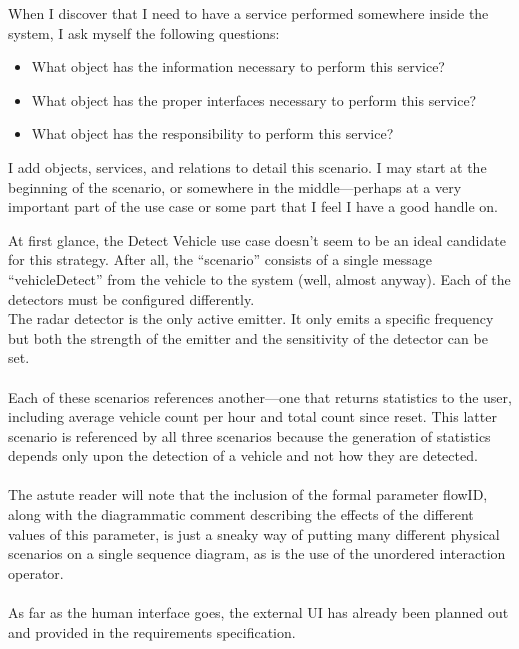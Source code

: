 \documentclass[12pt,a4paper]{article}
\begin{document}
When I discover that I need to have a service performed
somewhere inside the system, I ask myself the following questions:
\begin{itemize}
\item What object has the information necessary to perform this service?
\item What object has the proper interfaces necessary to perform this service?
\item What object has the responsibility to perform this service?

\end{itemize}
I add objects, services, and relations to detail this scenario. I may
start at the beginning of the scenario, or somewhere in the middle—perhaps at a
very important part of the use case or some part that I feel I have a good handle on.

At first glance, the Detect Vehicle use case doesn’t seem to be an ideal candidate
for this strategy. After all, the “scenario” consists of a single message “vehicleDetect” from the vehicle to the system (well, almost anyway). Each of the detectors must be configured
differently. \\

The radar detector is the only active emitter. It only emits a specific frequency
but both the strength of the emitter and the sensitivity of the detector can be set. \\ \\

Each of these scenarios references another—one that returns statistics to the
user, including average vehicle count per hour and total count since reset. This latter
scenario is referenced by all three scenarios because the generation of statistics depends only upon the detection of a vehicle and not how they are detected. \\ \\

The astute reader will note that the inclusion of the formal parameter flowID,
along with the diagrammatic comment describing the effects of the different values of this parameter, is just a sneaky way of putting many different physical scenarios on a single sequence diagram, as is the use of the unordered interaction operator. \\ \\
As far as the human interface goes, the external UI has already been planned out
and provided in the requirements specification.
\end{document}
